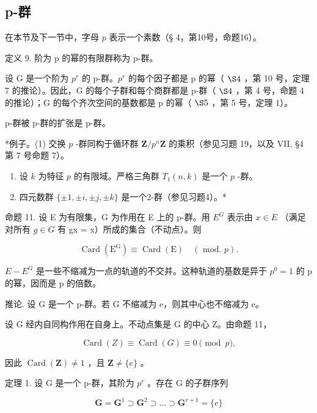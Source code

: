 \subsection{p-群}

在本节及下一节中，字母 \(p\) 表示一个素数（§ 4，第10号，命题16）。

定义 9. 阶为 p 的幂的有限群称为 p-群。

设 G 是一个阶为 \(p^{r}\) 的 p-群。\(p^{r}\) 的每个因子都是 p 的幂（ \(\S 4\) ，第 10 号，定理 7 的推论）。因此，G 的每个子群和每个商群都是 p-群（ \(\S 4\) ，第 4 号，命题 4 的推论）；G 的每个齐次空间的基数都是 p 的幂（ \(\S 5\) ，第 5 号，定理 1）。

p-群被 p-群的扩张是 p-群。

*例子。(1) 交换 \(p\) -群同构于循环群 \(\mathbf{Z} / p^n\mathbf{Z}\) 的乘积（参见习题 19，以及 VII, §4 第 7 号命题 7）。

\begin{enumerate}
\def\labelenumi{(\arabic{enumi})}
\setcounter{enumi}{1}
\item
  设 \(k\) 为特征 \(p\) 的有限域。严格三角群 \(T_1(n, k)\) 是一个 \(p\) -群。
\item
  四元数群 \(\{\pm 1, \pm i, \pm j, \pm k\}\) 是一个2-群（参见习题4）。*
\end{enumerate}

命题 11. 设 E 为有限集，G 为作用在 E 上的 p-群。用 \(E^{G}\) 表示由 \(x \in E\) （满足对所有 \(g \in G\) 有 gx = x）所成的集合（不动点）。则

\[
\operatorname{Card} \left(\mathrm{E} ^ {\mathrm{G}}\right) \equiv \operatorname{Card} (\mathrm{E}) \quad (\text { mod. } p).
\]

\(E - E^{G}\) 是一些不缩减为一点的轨道的不交并。这种轨道的基数是异于 \(p^{0} = 1\) 的 p 的幂，因而是 p 的倍数。

推论. 设 G 是一个 p-群。若 G 不缩减为 e，则其中心也不缩减为 e。

设 G 经内自同构作用在自身上。不动点集是 G 的中心 Z。由命题 11，

\[
\operatorname{Card} (Z) \equiv \operatorname{Card} (G) \equiv 0 \pmod {p},
\]

因此 \(\operatorname{Card}(\mathbf{Z}) \neq 1\) ，且 \(\mathbf{Z} \neq \{e\}\) 。

定理 1. 设 G 是一个 p-群，其阶为 \(p^{r}\) 。存在 G 的子群序列

\[
\mathbf {G} = \mathbf {G} ^ {1} \supset \mathbf {G} ^ {2} \supset \dots \supset \mathbf {G} ^ {r + 1} = \{e \}
\]

